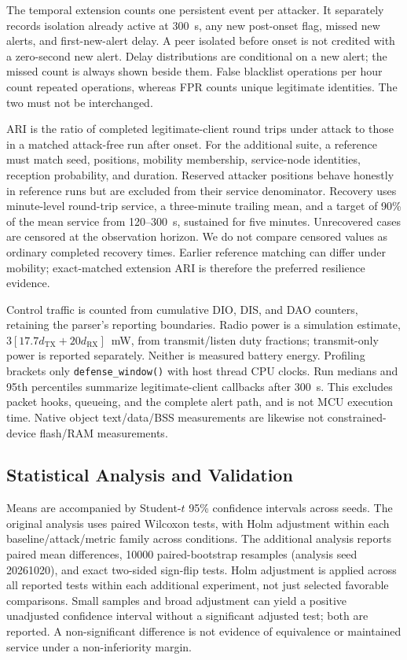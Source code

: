 The temporal extension counts one persistent event per attacker. It separately records isolation already active at 300~s, any new post-onset flag, missed new alerts, and first-new-alert delay. A peer isolated before onset is not credited with a zero-second new alert. Delay distributions are conditional on a new alert; the missed count is always shown beside them. False blacklist operations per hour count repeated operations, whereas FPR counts unique legitimate identities. The two must not be interchanged.

ARI is the ratio of completed legitimate-client round trips under attack to those in a matched attack-free run after onset. For the additional suite, a reference must match seed, positions, mobility membership, service-node identities, reception probability, and duration. Reserved attacker positions behave honestly in reference runs but are excluded from their service denominator. Recovery uses minute-level round-trip service, a three-minute trailing mean, and a target of 90\% of the mean service from 120--300~s, sustained for five minutes. Unrecovered cases are censored at the observation horizon. We do not compare censored values as ordinary completed recovery times. Earlier reference matching can differ under mobility; exact-matched extension ARI is therefore the preferred resilience evidence.

Control traffic is counted from cumulative DIO, DIS, and DAO counters, retaining the parser's reporting boundaries. Radio power is a simulation estimate, $3[17.7d_{\mathrm{TX}}+20d_{\mathrm{RX}}]$~mW, from transmit/listen duty fractions; transmit-only power is reported separately. Neither is measured battery energy. Profiling brackets only \texttt{defense\_window()} with host thread CPU clocks. Run medians and 95th percentiles summarize legitimate-client callbacks after 300~s. This excludes packet hooks, queueing, and the complete alert path, and is not MCU execution time. Native object text/data/BSS measurements are likewise not constrained-device flash/RAM measurements.

\subsection{Statistical Analysis and Validation}
Means are accompanied by Student-$t$ 95\% confidence intervals across seeds. The original analysis uses paired Wilcoxon tests, with Holm adjustment within each baseline/attack/metric family across conditions. The additional analysis reports paired mean differences, 10000 paired-bootstrap resamples (analysis seed 20261020), and exact two-sided sign-flip tests. Holm adjustment is applied across all reported tests within each additional experiment, not just selected favorable comparisons. Small samples and broad adjustment can yield a positive unadjusted confidence interval without a significant adjusted test; both are reported. A non-significant difference is not evidence of equivalence or maintained service under a non-inferiority margin.

